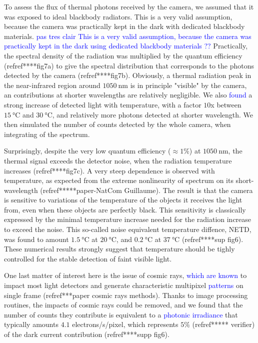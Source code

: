 \documentclass{article}
\begin{document}
To assess the flux of thermal photons received by the camera, we assumed that it was exposed to ideal blackbody radiators.
This is a very valid assumption, because the camera was practically kept in the dark with dedicated blackbody materials. \textcolor{blue}{pas tres clair} \textcolor{blue}{This is a very valid assumption, because the camera was practically kept in the dark using dedicated blackbody materials ??}
Practically, the spectral density of the radiation was multiplied by the quantum efficiency (refref****fig7a) to give the spectral distribution that corresponds to the photons detected by the camera (refref****fig7b).
Obviously, a thermal radiation peak in the near-infrared region around $\SI{1050}{\nano\meter}$ is in principle "visible" by the camera, an contributions at shorter wavelengths are relatively negligible.
We also \textcolor{blue}{found} a strong increase of detected light with temperature, with a factor $10$x between $\SI{15}{\celsius}$ and $\SI{30}{\celsius}$, and relatively more photons detected at shorter wavelength.
We then simulated the number of counts detected by the whole camera, when integrating of the spectrum.

Surprisingly, despite the very low quantum efficiency ($\approx 1\%$) at $\SI{1050}{\nano\meter}$, the thermal signal exceeds the detector noise, when the radiation temperature increases (refref****fig7c).
A very steep dependence is observed with temperature, as expected from the extreme nonlinearity of spectrum on its short-wavelength (refref*****paper-NatCom Guillaume).
The result is that the camera is sensitive to variations of the temperature of the objects it receives the light from, even when these objects are perfectly black.
This sensitivity is classically expressed by the minimal temperature increase needed for the radiation increase to exceed the noise.
This so-called noise equivalent temperature diffence, NETD, was found to amount $\SI{1.5}{\celsius}$ at $\SI{20}{\celsius}$, and $\SI{0.2}{\celsius}$ at $\SI{37}{\celsius}$ (refref****sup fig6).
These numerical results strongly suggest that temperature should be tighly controlled for the stable detection of faint visible light.

One last matter of interest here is the issue of cosmic rays, \textcolor{blue}{which are known} to impact most light detectors and generate characteristic multipixel \textcolor{blue}{patterns} on single frame (refref***paper cosmic rays methods).
Thanks to image processing routines, the impacts of cosmic rays could be removed, and we found that the number of counts they contribute is equivalent to a \textcolor{blue}{photonic irradiance} that typically amounts $4.1$ electrons/s/pixel, which represents $5\%$ (refref***** verifier) of the dark current contribution (refref****supp fig6).
\end{document}
